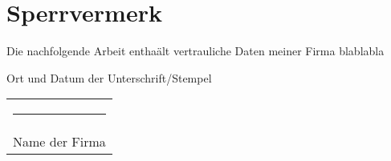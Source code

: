 
\thispagestyle{empty}

\section*{Sperrvermerk}
\vspace*{2em}

Die nachfolgende Arbeit enthaält vertrauliche Daten meiner Firma blablabla

\vspace{3em}

{\color{red}Ort und Datum der Unterschrift/Stempel}
\vspace{4em}

\begin{tabular}{p{}}
    \rule{7cm}{0.4pt}\\
    Name der Firma
\end{tabular}


